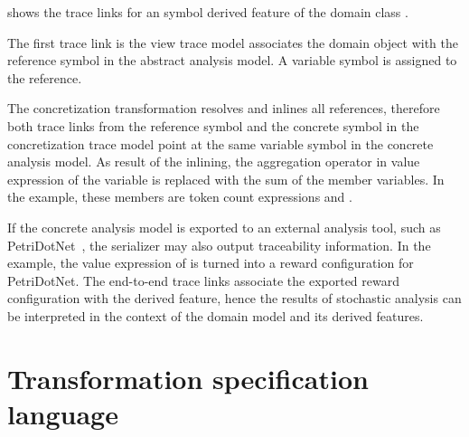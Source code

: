 \begin{runningExample}
   shows the trace links for an  symbol derived feature  of the domain class .

  The first trace link is the view trace model associates the domain object  with the reference symbol  in the abstract analysis model. A variable symbol is assigned to the reference.

  The concretization transformation resolves and inlines all references, therefore both trace links from the reference symbol and the concrete symbol in the concretization trace model point at the same variable symbol in the concrete analysis model. As result of the inlining, the aggregation operator in value expression of the variable is replaced with the sum of the member variables. In the example, these members are token count expressions  and .

  If the concrete analysis model is exported to an external analysis tool, such as PetriDotNet~\citep{Voros17pdn}, the  serializer may also output traceability information. In the example, the value expression of  is turned into a reward configuration for PetriDotNet. The end-to-end trace links associate the exported reward configuration with the derived feature, hence the results of stochastic analysis can be interpreted in the context of the domain model and its derived features.
\end{runningExample}

\section{Transformation specification language}

